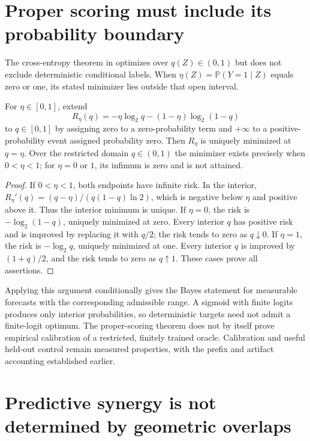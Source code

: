 \section{Proper scoring must include its probability boundary}

The cross-entropy theorem in \citet{ToricAuditOracle2026} optimizes over
$q(Z)\in(0,1)$ but does not exclude deterministic conditional labels.
When $\eta(Z)=\mathbb P(Y=1\mid Z)$ equals zero or one, its stated
minimizer lies outside that open interval.

\begin{proposition}
\label{prop:oracle-logloss-endpoints}
For $\eta\in[0,1]$, extend
\[
 R_\eta(q)=-\eta\log_2q-(1-\eta)\log_2(1-q)
\]
to $q\in[0,1]$ by assigning zero to a zero-probability term and
$+\infty$ to a positive-probability event assigned probability zero.
Then $R_\eta$ is uniquely minimized at $q=\eta$. Over the restricted
domain $q\in(0,1)$ the minimizer exists precisely when $0<\eta<1$;
for $\eta=0$ or $1$, its infimum is zero and is not attained.
\end{proposition}
\begin{proof}
If $0<\eta<1$, both endpoints have infinite risk. In the interior,
$R_\eta'(q)=(q-\eta)/(q(1-q)\ln2)$, which is negative below
$\eta$ and positive above it. Thus the interior minimum is unique.
If $\eta=0$, the risk is $-\log_2(1-q)$, uniquely minimized at zero.
Every interior $q$ has positive risk and is improved by replacing it
with $q/2$; the risk tends to zero as $q\downarrow0$. If $\eta=1$,
the risk is $-\log_2q$, uniquely minimized at one. Every interior
$q$ is improved by $(1+q)/2$, and the risk tends to zero as
$q\uparrow1$. These cases prove all assertions.
\end{proof}

Applying this argument conditionally gives the Bayes statement for
measurable forecasts with the corresponding admissible range. A sigmoid
with finite logits produces only interior probabilities, so deterministic
targets need not admit a finite-logit optimum. The proper-scoring theorem
does not by itself prove empirical calibration of a restricted, finitely
trained oracle. Calibration and useful held-out control remain measured
properties, with the prefix and artifact accounting established earlier.

\section{Predictive synergy is not determined by geometric overlaps}

